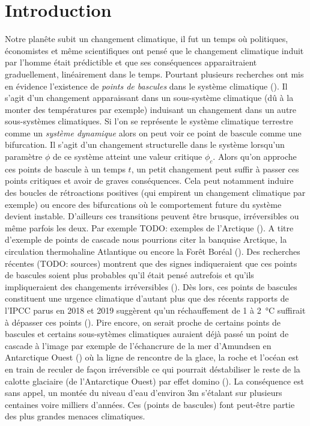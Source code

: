 \section{Introduction}

Notre planête subit un changement climatique, il fut un temps où politiques, économistes et même scientifiques ont pensé que le changement climatique induit par l'homme était prédictible et que ses conséquences apparaitraient graduellement, linéairement dans le temps. Pourtant plusieurs recherches ont mis en évidence l'existence de \emph{points de bascules} dans le système climatique (\cite{lenton_tipping_2008}). Il s'agit d'un changement apparaissant dans un sous-système climatique (dû à la monter des températures par exemple) induisant un changement dans un autre sous-systèmes climatiques. Si l'on se représente le système climatique terrestre comme un \emph{système dynamique} alors on peut voir ce point de bascule comme une bifurcation. Il s'agit d'un changement structurelle dans le système lorsqu'un paramètre $\phi$ de ce système atteint une valeur critique $\phi_c$. Alors qu'on approche ces points de bascule à un temps $t$, un petit changement peut suffir à passer ces points critiques et avoir de graves conséquences. Cela peut notamment induire des boucles de rétroactions positives (qui empirent un changement climatique par exemple) ou encore des bifurcations où le comportement  future du système devient instable. D'ailleurs ces transitions peuvent être brusque, irréversibles ou même parfois les deux. Par exemple TODO: exemples de l'Arctique (\cite{Lenton_2012}). A titre d'exemple de points de cascade nous pourrions citer la banquise Arctique, la circulation thermohaline Atlantique ou encore la Forêt Boréal (\cite{lenton_tipping_2008}). Des recherches récentes (TODO: sources) montrent que des signes indiqueraient que ces points de bascules soient plus probables qu'il était pensé autrefois et qu'ils impliqueraient des changements irréversibles (\cite{lenton_climate_2019_too_risky}). Dès lors, ces points de bascules constituent une urgence climatique d'autant plus que des récents rapports de l'IPCC parus en 2018 et 2019 suggèrent qu'un réchauffement de 1 à \SI{2}{\celsius} suffirait à dépasser ces points (\cite{ipcc_global_2018,portner_ipcc_2019}). Pire encore, on serait proche de certains points de bascules et certains sous-sytèmes climatiques auraient déjà passé un point de cascade à l'image par exemple de l'échancrure de la mer d'Amundsen en Antarctique Ouest (\cite{portner_ipcc_2019}) où la ligne de rencontre de la glace, la roche et l'océan est en train de reculer de façon irréversible ce qui pourrait déstabiliser le reste de la calotte glaciaire (de l'Antarctique Ouest) par effet domino (\cite{feldmann_collapse_2015_amundsen}). La conséquence est sans appel, un montée du niveau d'eau d'environ 3m s'étalant sur plusieurs centaines voire milliers d'années. Ces (points de bascules) font peut-être partie des plus grandes menaces climatiques.


